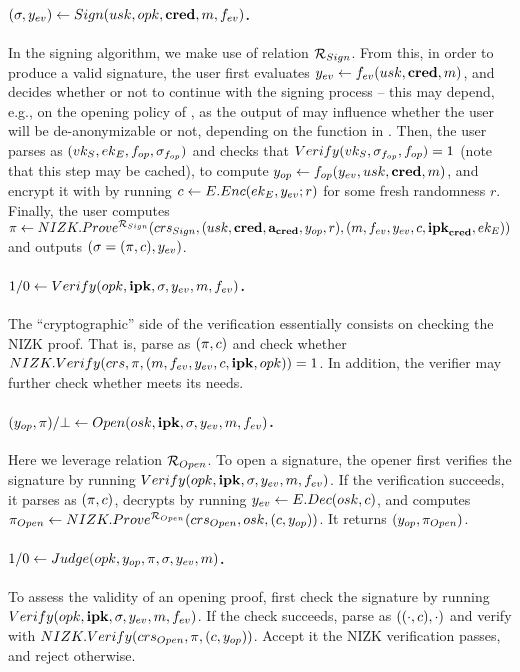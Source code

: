 \paragraph{$(\sigma,y_{ev}) \gets Sign(usk,opk,\mathbf{cred},m,f_{ev})$.} %
In the signing algorithm, we make use of relation $\mathcal{R}_{Sign}$.
% 
From this, in order to produce a valid signature, the user first evaluates
$y_{ev} \gets f_{ev} (usk,\mathbf{cred},m)$, and decides whether or not to continue
with the signing process -- this may depend, e.g., on the opening policy of
\opk, as the output of \feval may influence whether the user will be
de-anonymizable or not, depending on the \finsp function in \opk.
%
Then, the user parses \opk as $(vk_{S},ek_{E},f_{op},\sigma_{f_{op}})$ and checks that
$Verify(vk_{S},\sigma_{f_{op}},f_{op}) = 1$ (note that this step may be cached), to
compute $y_{op} \gets f_{op}(y_{ev},usk,\mathbf{cred},m)$, and encrypt it with
\Eek by running $c \gets E.Enc(ek_{E},y_{ev};r)$ for some fresh randomness $r$.
Finally, the user computes
$\pi \gets NIZK.Prove^{\mathcal{R}_{Sign}}(crs_{Sign},(usk,\mathbf{cred},
\mathbf{a}_{\mathbf{cred}},y_{op},r),(m,f_{ev},y_{ev},c,\mathbf{ipk}_{\mathbf{cred}},ek_{E}))$ and
outputs $(\sigma = (\pi,c),y_{ev})$.

\paragraph{$1/0 \gets Verify(opk,\mathbf{ipk},\sigma,y_{ev},m,f_{ev})$.} %
The ``cryptographic'' side of the verification essentially consists on checking
the NIZK proof. That is, parse \sig as $(\pi,c)$ and check whether
$NIZK.Verify(crs,\pi,(m,f_{ev},y_{ev},c,\mathbf{ipk},opk)) = 1$. In
addition, the verifier may further check whether \yeval meets its needs.

\paragraph{$(y_{op},\pi)/\bot \gets
  Open(osk,\mathbf{ipk},\sigma,y_{ev},m,f_{ev})$.} %
Here we leverage relation $\mathcal{R}_{Open}$.
%
To open a signature, the opener first verifies the signature by running $Verify
(opk,\mathbf{ipk}, \sigma,y_{ev},m,f_{ev})$. If the verification succeeds, it parses
\sig as $(\pi,c)$, decrypts \Ec by running $y_{ev} \gets E.Dec(osk,
c)$, and computes $\pi_{Open} \gets NIZK.Prove^{\mathcal{R}_{Open}}
(crs_{Open},osk,(c,y_{op}))$. It returns $(y_{op},
\pi_{Open})$.

\paragraph{$1/0 \gets Judge(opk,y_{op},\pi,\sigma,y_{ev},m)$.} %
To assess the validity of an opening proof, first check the signature
by running $Verify(opk,\mathbf{ipk}, \sigma,y_{ev},m,f_{ev})$. If the check succeeds,
parse \sig as $((\cdot,c),\cdot)$ and verify \NIZKproof with $NIZK.Verify
(crs_{Open},\pi,(c,y_{op}))$. Accept it the NIZK verification
passes, and reject otherwise.

%

